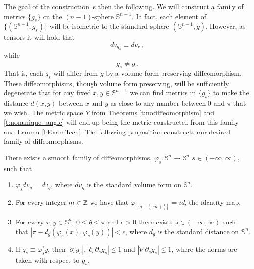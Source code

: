 \documentclass[11pt]{article}
\newcommand{\ZZ}{\mathds{Z}}
\newcommand{\Sn}{\mathds{S}}
\begin{document}
The goal of the construction is then the following.  We will construct a family of metrics $\{g_s\}$ on the $(n-1)$-sphere $\Sn^{n-1}$.  In fact, each element of $\{(\Sn^{n-1},g_s)\}$ will be isometric to the standard sphere $(\Sn^{n-1},g)$.  However, as tensors it will hold that
$$dv_{g_s}\equiv dv_g\, ,$$
while
$$g_s\neq g\, .$$
That is, each $g_s$ will differ from $g$ by a volume form preserving diffeomorphism.  These diffeomorphisms, though volume form preserving, will be sufficiently degenerate that for any fixed $x,y\in \Sn^{n-1}$ we can find metrics in $\{g_s\}$ to make the distance $d(x,y)$ between $x$ and $y$ as close to any number between $0$ and $\pi$ that we wish.  The metric space $Y$ from Theorems \ref{t:nodiffeomorphism} and \ref{t:nonunique_angle} will end up being the metric constructed from this family and Lemma \ref{l:ExamTech}.  The following proposition constructs our desired family of diffeomorphisms.

\begin{proposition}\label{p:Sn_diffeos}
 There exists a smooth family of diffeomorphisms, $\varphi_s:\Sn^n\rightarrow\Sn^n$ $s\in (-\infty,\infty)$, such that
 \begin{enumerate}
 \item $\varphi_sdv_g = dv_g$, where $dv_g$ is the standard volume form on $\Sn^n$.
 \item For every integer $m\in\ZZ$ we have that $\varphi_{[m-\frac{1}{4},m+\frac{1}{4}]}=id$, the identity map.
 \item For every $x,y\in\Sn^n$, $0\leq\theta\leq\pi$ and $\epsilon>0$ there exists $s \in (-\infty,\infty)$ such that $|\pi-d_g(\varphi_{s}(x),\varphi_{s}(y))| <\epsilon$, where $d_g$ is the standard distance on $\Sn^n$.
 \item If $g_s\equiv\varphi_s^*g$, then $|\partial_{s}g_s|,|\partial_{s}\partial_{s}g_s|\leq 1$ and $|\nabla\partial_{s}g_s|\leq 1$, where the norms are taken with respect to $g_s$.
 \end{enumerate}
\end{proposition}
\end{document}
